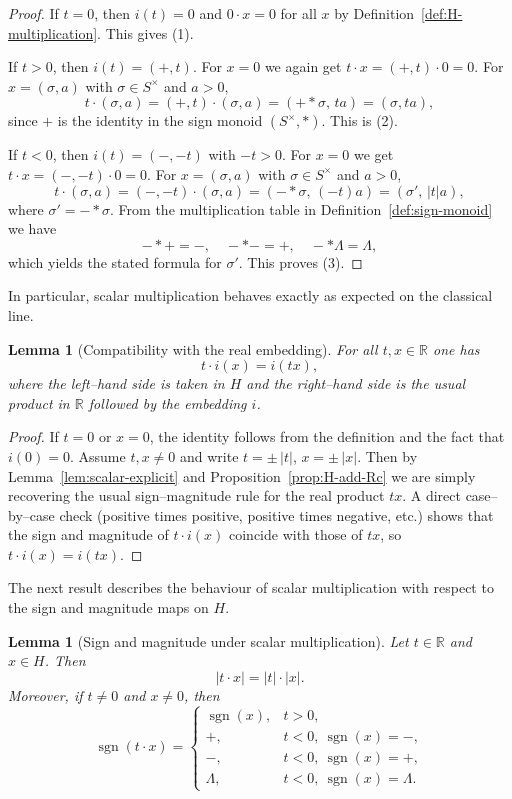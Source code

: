 \documentclass[11pt]{amsart}
\numberwithin{equation}{section}
\newtheorem{lemma}[theorem]{Lemma}
\theoremstyle{definition}
\theoremstyle{remark}
\newcommand{\R}{\mathbb{R}}
\newcommand{\Hnum}{H}                      %
\newcommand{\Snon}{S^{\times}}             %
\newcommand{\sgn}{\operatorname{sgn}}
\newcommand{\iemb}{i}                      %
\begin{document}
\begin{proof}
If $t=0$, then $\iemb(t)=0$ and $0\cdot x=0$ for all $x$ by
Definition~\ref{def:H-multiplication}.  This gives (1).

If $t>0$, then $\iemb(t)=(+,t)$.  For $x=0$ we again get
$t\cdot x = (+,t)\cdot0=0$.  For $x=(\sigma,a)$ with $\sigma\in\Snon$
and $a>0$,
\[
  t\cdot(\sigma,a)
  = ( +,t )\cdot(\sigma,a)
  = (+*\sigma,\, ta)
  = (\sigma,ta),
\]
since $+$ is the identity in the sign monoid $(\Snon,*)$.  This is (2).

If $t<0$, then $\iemb(t)=(-,-t)$ with $-t>0$.  For $x=0$ we get
$t\cdot x = (-,-t)\cdot0=0$.  For $x=(\sigma,a)$ with $\sigma\in\Snon$
and $a>0$,
\[
  t\cdot(\sigma,a)
  = (-,-t)\cdot(\sigma,a)
  = (-*\sigma,\,(-t)a)
  = (\sigma',\,|t|a),
\]
where $\sigma'=-*\sigma$.  From the multiplication table in
Definition~\ref{def:sign-monoid} we have
\[
  -*+ = -, \quad - * - = +, \quad - * \Lambda = \Lambda,
\]
which yields the stated formula for $\sigma'$.  This proves (3).
\end{proof}

In particular, scalar multiplication behaves exactly as expected on
the classical line.

\begin{lemma}[Compatibility with the real embedding]
\label{lem:scalar-Rc}
For all $t,x\in\R$ one has
\[
  t\cdot\iemb(x) = \iemb(tx),
\]
where the left–hand side is taken in $\Hnum$ and the right–hand side
is the usual product in $\R$ followed by the embedding $\iemb$.
\end{lemma}

\begin{proof}
If $t=0$ or $x=0$, the identity follows from the definition and the
fact that $\iemb(0)=0$.  Assume $t,x\ne0$ and write
$t=\pm\,|t|$, $x=\pm\,|x|$.  Then by
Lemma~\ref{lem:scalar-explicit} and Proposition~\ref{prop:H-add-Rc}
we are simply recovering the usual sign–magnitude rule for the real
product $tx$.  A direct case–by–case check (positive times positive,
positive times negative, etc.) shows that the sign and magnitude of
$t\cdot\iemb(x)$ coincide with those of $tx$, so
$t\cdot\iemb(x)=\iemb(tx)$.
\end{proof}

The next result describes the behaviour of scalar multiplication with
respect to the sign and magnitude maps on $\Hnum$.

\begin{lemma}[Sign and magnitude under scalar multiplication]
\label{lem:scalar-sgn-mag}
Let $t\in\R$ and $x\in\Hnum$.  Then
\[
  |t\cdot x| = |t|\cdot|x|.
\]
Moreover, if $t\ne0$ and $x\ne0$, then
\[
  \sgn(t\cdot x)
  =
  \begin{cases}
    \sgn(x),     & t>0,\\[2pt]
    +,           & t<0,\ \sgn(x)=-,\\[2pt]
    -,           & t<0,\ \sgn(x)=+,\\[2pt]
    \Lambda,     & t<0,\ \sgn(x)=\Lambda.
  \end{cases}
\]
\end{lemma}
\end{document}
